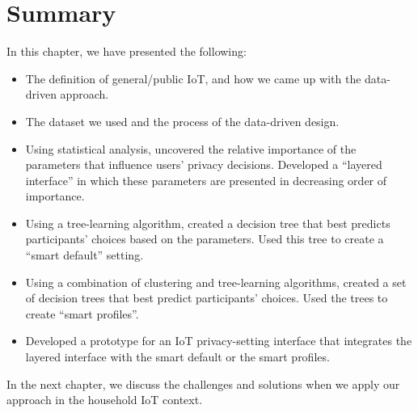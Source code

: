 \section{Summary}
In this chapter, we have presented the following:

\begin{itemize}
    \item The definition of general/public IoT, and how we came up with the data-driven approach.
    \item The dataset we used and the process of the data-driven design.
	\item Using statistical analysis, uncovered the relative importance of the parameters that influence users' privacy decisions. Developed a ``layered interface'' in which these parameters are presented in decreasing order of importance.
	\item Using a tree-learning algorithm, created a decision tree that best predicts participants' choices based on the parameters. Used this tree to create a ``smart default'' setting.
	\item Using a combination of clustering and tree-learning algorithms, created a set of decision trees that best predict participants' choices. Used the trees to create ``smart profiles''.
	\item Developed a prototype for an IoT privacy-setting interface that integrates the layered interface with the smart default or the smart profiles.
\end{itemize}

In the next chapter, we discuss the challenges and solutions when we apply our approach in the household IoT context. 
